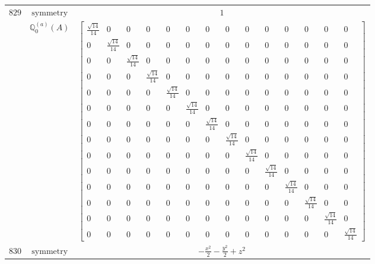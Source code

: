 \documentclass[fleqn,8pt,landscape]{jsarticle}
\begin{document}
\begin{longtable}{ccc}
$ 829 $ & $ \text{symmetry} $ & $ 1 $ \\
$  $ & $ \mathbb{Q}_{0}^{(a)}(A) $ & $ \begin{bmatrix} \frac{\sqrt{14}}{14} & 0 & 0 & 0 & 0 & 0 & 0 & 0 & 0 & 0 & 0 & 0 & 0 & 0 \\ 0 & \frac{\sqrt{14}}{14} & 0 & 0 & 0 & 0 & 0 & 0 & 0 & 0 & 0 & 0 & 0 & 0 \\ 0 & 0 & \frac{\sqrt{14}}{14} & 0 & 0 & 0 & 0 & 0 & 0 & 0 & 0 & 0 & 0 & 0 \\ 0 & 0 & 0 & \frac{\sqrt{14}}{14} & 0 & 0 & 0 & 0 & 0 & 0 & 0 & 0 & 0 & 0 \\ 0 & 0 & 0 & 0 & \frac{\sqrt{14}}{14} & 0 & 0 & 0 & 0 & 0 & 0 & 0 & 0 & 0 \\ 0 & 0 & 0 & 0 & 0 & \frac{\sqrt{14}}{14} & 0 & 0 & 0 & 0 & 0 & 0 & 0 & 0 \\ 0 & 0 & 0 & 0 & 0 & 0 & \frac{\sqrt{14}}{14} & 0 & 0 & 0 & 0 & 0 & 0 & 0 \\ 0 & 0 & 0 & 0 & 0 & 0 & 0 & \frac{\sqrt{14}}{14} & 0 & 0 & 0 & 0 & 0 & 0 \\ 0 & 0 & 0 & 0 & 0 & 0 & 0 & 0 & \frac{\sqrt{14}}{14} & 0 & 0 & 0 & 0 & 0 \\ 0 & 0 & 0 & 0 & 0 & 0 & 0 & 0 & 0 & \frac{\sqrt{14}}{14} & 0 & 0 & 0 & 0 \\ 0 & 0 & 0 & 0 & 0 & 0 & 0 & 0 & 0 & 0 & \frac{\sqrt{14}}{14} & 0 & 0 & 0 \\ 0 & 0 & 0 & 0 & 0 & 0 & 0 & 0 & 0 & 0 & 0 & \frac{\sqrt{14}}{14} & 0 & 0 \\ 0 & 0 & 0 & 0 & 0 & 0 & 0 & 0 & 0 & 0 & 0 & 0 & \frac{\sqrt{14}}{14} & 0 \\ 0 & 0 & 0 & 0 & 0 & 0 & 0 & 0 & 0 & 0 & 0 & 0 & 0 & \frac{\sqrt{14}}{14} \end{bmatrix} $ \\ \hline
$ 830 $ & $ \text{symmetry} $ & $ - \frac{x^{2}}{2} - \frac{y^{2}}{2} + z^{2} $ \\

\end{longtable}
\end{document}
